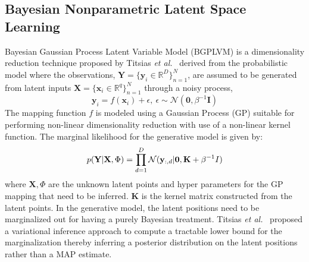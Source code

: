 \documentclass{article}
\begin{document}
\subsection{Bayesian Nonparametric Latent Space Learning}
\label{section:bgplvm}

Bayesian Gaussian Process Latent Variable Model (BGPLVM) is a dimensionality reduction technique proposed by Titsias \emph{et al.}~\cite{bgplvm}  derived from the probabilistic model where the observations, $\mathbf{Y} = \{\mathbf{y}_{i} \in \mathbb{R}^D\}_{n=1}^N$, are assumed to be generated from latent inputs $\mathbf{X} = \{\mathbf{x}_{i} \in \mathbb{R}^q\}_{n=1}^N$ through a noisy process,
\begin{equation}
  \mathbf{y}_i = f(\mathbf{x}_i) + \epsilon,~\epsilon \sim \mathcal{N}(\mathbf{0},\beta^{-1}\mathbf{I})
\end{equation}
The mapping function $f$ is modeled using a Gaussian Process (GP) suitable for performing non-linear dimensionality reduction with use of a non-linear kernel function. The marginal likelihood for the generative model is given by:
\begin{equation}
  \label{eqn:marginallikelihood}
  p(\mathbf{Y}|\mathbf{X},\Phi) = \prod_{d=1}^{D} \mathcal{N}(\mathbf{y}_{:,d}|\mathbf{0},\mathbf{K}+\beta^{-1}I)\\
\end{equation}
where $\mathbf{X},\Phi$ are the unknown latent points and hyper parameters for the GP mapping that need to be inferred. $\mathbf{K}$ is the kernel matrix constructed from the latent points. In the generative model, the latent positions need to be marginalized out for having a purely Bayesian treatment. Titsias \emph{et al.}~\cite{bgplvm} proposed a variational inference approach to compute a tractable lower bound for the marginalization thereby inferring a posterior distribution on the latent positions rather than a MAP estimate.
\end{document}

